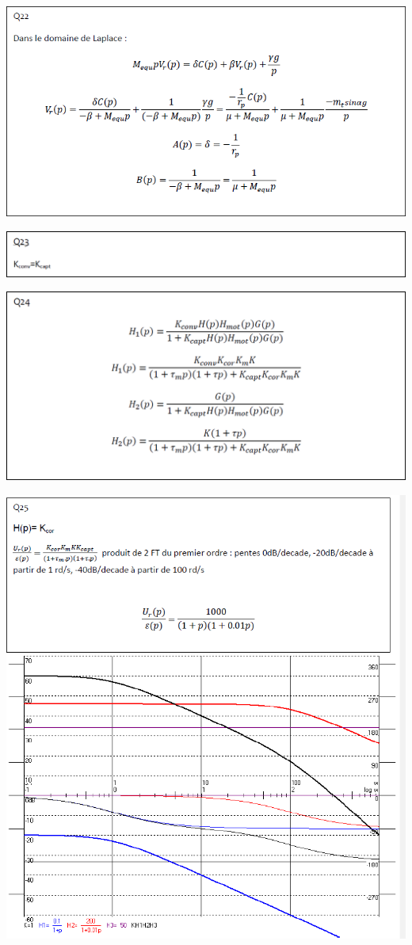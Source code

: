 \documentclass[10pt,fleqn]{article} %
\begin{document}
\newpage


\begin{center}
	\includegraphics[width=.8\linewidth]{images/cor_01}
\end{center}

\begin{center}
	\includegraphics[width=.8\linewidth]{images/cor_02}
\end{center}

\begin{center}
	\includegraphics[width=.8\linewidth]{images/cor_03}
\end{center}

\begin{center}
	\includegraphics[width=.8\linewidth]{images/cor_04}
\end{center}
\end{document}
